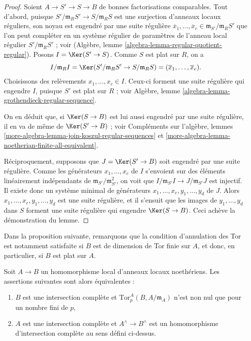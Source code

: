 \begin{proof}
\medskip\noindent
Soient $A \to S' \to S \to B$ de bonnes factorisations comparables.
Tout d'abord, puisque $S'/\mathfrak m_R S' \to S/\mathfrak m_R S$ est
une surjection d'anneaux locaux réguliers, son noyau est engendré
par une suite régulière
$\overline{x}_1, \ldots, \overline{x}_c \in
\mathfrak m_{S'}/\mathfrak m_R S'$
que l'on peut compléter en un système régulier de paramètres de
l'anneau local régulier $S'/\mathfrak m_R S'$ ; voir
(Algèbre, lemme \ref{algebra-lemma-regular-quotient-regular}).
Posons $I = \Ker(S' \to S)$. Comme $S$ est plat sur $R$, on a
$$
I/\mathfrak m_R I =
\Ker(S'/\mathfrak m_R S' \to S/\mathfrak m_R S) =
(\overline{x}_1, \ldots, \overline{x}_c).
$$
Choisissons des relèvements $x_1, \ldots, x_c \in I$. Ceux-ci forment une suite régulière
qui engendre $I$, puisque $S'$ est plat sur $R$ ; voir
Algèbre, lemme \ref{algebra-lemma-grothendieck-regular-sequence}.

\medskip\noindent
On en déduit que, si $\Ker(S \to B)$ est lui aussi engendré par une
suite régulière, il en va de même de $\Ker(S' \to B)$ ; voir
Compléments sur l'algèbre, lemmes
\ref{more-algebra-lemma-join-koszul-regular-sequences} et
\ref{more-algebra-lemma-noetherian-finite-all-equivalent}.

\medskip\noindent
Réciproquement, supposons que $J = \Ker(S' \to B)$ soit engendré
par une suite régulière. Comme les générateurs $x_1, \ldots, x_c$
de $I$ s'envoient sur des éléments linéairement indépendants de
$\mathfrak m_{S'}/\mathfrak m_{S'}^2$, on voit que
$I/\mathfrak m_{S'}I \to J/\mathfrak m_{S'}J$ est injectif.
Il existe donc un système minimal de générateurs
$x_1, \ldots, x_c, y_1, \ldots, y_d$ de $J$.
Alors $x_1, \ldots, x_c, y_1, \ldots, y_d$ est une suite régulière,
et il s'ensuit que les images de $y_1, \ldots, y_d$ dans $S$
forment une suite régulière qui engendre $\Ker(S \to B)$.
Ceci achève la démonstration du lemme.
\end{proof}

\noindent
Dans la proposition suivante, remarquons que la condition d'annulation des
Tor est notamment satisfaite si $B$ est de dimension de Tor finie sur $A$, et
donc, en particulier, si $B$ est plat sur $A$.

\begin{proposition}
\label{proposition-avramov-map}
Soit $A \to B$ un homomorphisme local d'anneaux locaux noethériens.
Les assertions suivantes sont alors équivalentes :
\begin{enumerate}
\item $B$ est une intersection complète et
$\text{Tor}^A_p(B, A/\mathfrak m_A)$ n'est non nul que pour un nombre fini de $p$,
\item $A$ est une intersection complète et
$A^\wedge \to B^\wedge$ est un homomorphisme d'intersection complète
au sens défini ci-dessus.
\end{enumerate}
\end{proposition}

